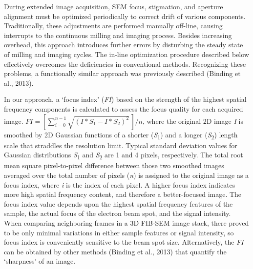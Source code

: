 \documentclass{article}
\begin{document}
During extended image acquisition, SEM focus, stigmation, and aperture alignment must be optimized periodically to correct drift of various components. Traditionally, these adjustments are performed manually off-line, causing interrupts to the continuous milling and imaging process. Besides increasing overhead, this approach introduces further errors by disturbing the steady state of milling and imaging cycles. The in-line optimization procedure described below effectively overcomes the deficiencies in conventional methods. Recognizing these problems, a functionally similar approach was previously described (Binding et al., 2013).

In our approach, a ‘focus index’ (\emph{FI}) based on the strength of the highest spatial frequency components is calculated to assess the focus quality for each acquired image. $FI = [\sum_{i=0}^{n-1} \sqrt{(I \ast S_1 - I \ast S_2)^2}\,]/n$, where the original 2D image \emph{I} is smoothed by 2D Gaussian functions of a shorter (\emph{S}\textsubscript{1}) and a longer (\emph{S}\textsubscript{2}) length scale that straddles the resolution limit. Typical standard deviation values for Gaussian distributions \emph{S}\textsubscript{1} and \emph{S}\textsubscript{2} are 1 and 4 pixels, respectively. The total root mean square pixel-to-pixel difference between those two smoothed images averaged over the total number of pixels (\emph{n}) is assigned to the original image as a focus index, where \emph{i} is the index of each pixel. A higher focus index indicates more high spatial frequency content, and therefore a better-focused image. The focus index value depends upon the highest spatial frequency features of the sample, the actual focus of the electron beam spot, and the signal intensity. When comparing neighboring frames in a 3D FIB-SEM image stack, there proved to be only minimal variations in either sample features or signal intensity, so focus index is conveniently sensitive to the beam spot size. Alternatively, the \emph{FI} can be obtained by other methods (Binding et al., 2013) that quantify the ‘sharpness’ of an image.
\end{document}
